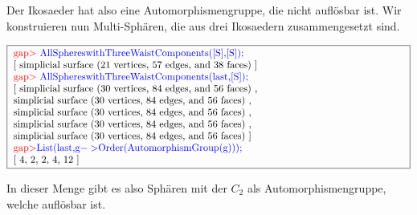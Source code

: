 \documentclass[12pt,titlepage,twoside,cleardoublepage]{article}
\theoremstyle{nummermitklammern}
\numberwithin{equation}{section}
\begin{document}
Der Ikosaeder hat also eine Automorphismengruppe, die nicht auflösbar ist. Wir konstruieren nun Multi-Sphären, die aus drei Ikosaedern zusammengesetzt sind.
\begin{center}
$\fbox{
\parbox{14cm}{
\textcolor{red}{gap$>$} \textcolor{blue}{AllSphereswithThreeWaistComponents([S],[S]);}\newline
[ simplicial surface (21 vertices, 57 edges, and 38 faces)
 ]\newline
\textcolor{red}{gap$>$} \textcolor{blue}{AllSphereswithThreeWaistComponents(last,[S]);}\newline
[ simplicial surface (30 vertices, 84 edges, and 56 faces)
    ,\newline simplicial surface (30 vertices, 84 edges, and 56 faces)
    , \newline simplicial surface (30 vertices, 84 edges, and 56 faces)
    ,\newline simplicial surface (30 vertices, 84 edges, and 56 faces)
    ,\newline
  simplicial surface (30 vertices, 84 edges, and 56 faces)
 ]\newline
\textcolor{red}{gap$>$}\textcolor{blue}{ List(last,g$->$Order(AutomorphismGroup(g)));}\newline
[ 4, 2, 2, 4, 12 ]
}}$
\end{center}
In dieser Menge gibt es also Sphären mit der $C_2$ als Automorphismengruppe, welche auflösbar ist.
\end{document}
